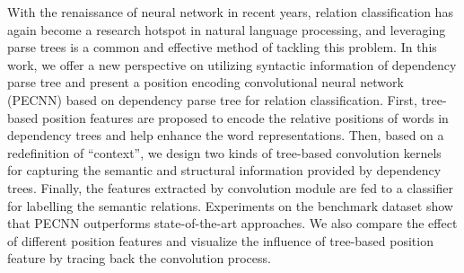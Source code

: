 With the renaissance of neural network in recent years, relation classification has again become a research hotspot in natural language processing, and leveraging parse trees is a common and effective method of tackling this problem. In this work, we offer a new perspective on utilizing syntactic information of dependency parse tree and present a position encoding convolutional neural network (PECNN) based on dependency parse tree for relation classification. First, tree-based position features are proposed to encode the relative positions of words in dependency trees and help enhance the word representations. Then, based on a redefinition of ``context'', we design two kinds of tree-based convolution kernels for capturing the semantic and structural information provided by dependency trees. Finally, the features extracted by convolution module are fed to a classifier for labelling the semantic relations. Experiments on the benchmark dataset show that PECNN outperforms state-of-the-art approaches. We also compare the effect of different position features and visualize the influence of tree-based position feature by tracing back the convolution process.
